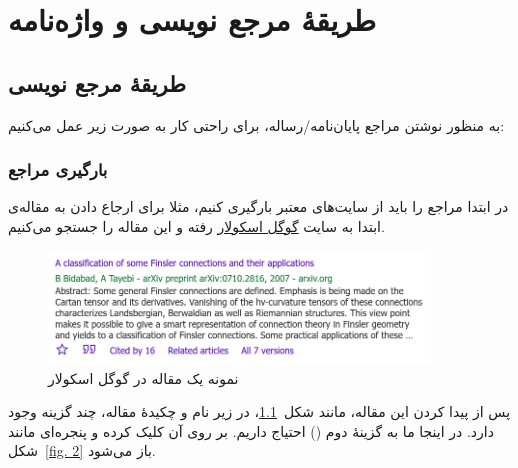      \chapter{طریقه‌ٔ مرجع نویسی و واژه‌نامه‌}
     \label{chap:bibindex}
    \section{طریقه‌ٔ مرجع نویسی}
    به منظور نوشتن مراجع پایان‌نامه/رساله، برای راحتی کار به صورت زیر عمل می‌کنیم:
    \subsection{بارگیری مراجع}
    در ابتدا مراجع را باید از سایت‌های معتبر بارگیری کنیم، مثلا برای ارجاع دادن به مقاله‌ی 
    \hbox{} 
    ابتدا به سایت \href{scholar.google.com}{گوگل اسکولار} رفته و این مقاله را جستجو می‌کنیم. 
    
        \begin{figure}[!h]
    \centering
    \includegraphics[height=3cm]{bidabad}
    \caption{نمونه یک مقاله در گوگل اسکولار}
    \label{fig:bidabad}
    \end{figure}
    
    پس از پیدا کردن این مقاله، مانند شکل~\ref{fig:bidabad}، در زیر نام و چکیده‌ٔ مقاله، چند گزینه وجود دارد.
    در اینجا ما به گزینه‌ٔ دوم 
    () احتیاج داریم. بر روی آن کلیک کرده و پنجره‌ای مانند شکل~\ref{fig. 2} باز می‌شود.

